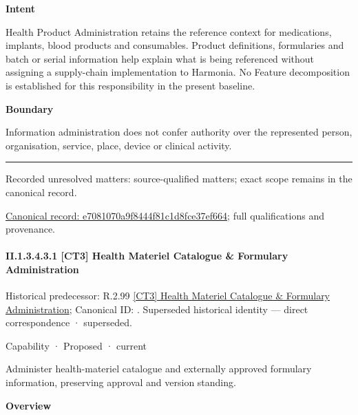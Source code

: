 \textbf{Intent}



Health Product Administration retains the reference context for medications, implants, blood products and consumables. Product definitions, formularies and batch or serial information help explain what is being referenced without assigning a supply-chain implementation to Harmonia. No Feature decomposition is established for this responsibility in the present baseline.



\textbf{Boundary}



Information administration does not confer authority over the represented person, organisation, service, place, device or clinical activity.



\medskip\hrule\medskip

{\small Recorded unresolved matters: source-qualified matters; exact scope remains in the canonical record.}\par
{\footnotesize \href{../../../../continuum/strategy/capability/e7081070a9f8444f81c1d8fce37ef664.md}{Canonical record: e7081070a9f8444f81c1d8fce37ef664}; full qualifications and provenance.}\par
\paragraph*{II.1.3.4.3.1 [CT3] Health Materiel Catalogue \& Formulary Administration}
\label{navigation:II.1.3.4.3.1}

{\small Historical predecessor: R.2.99 \hyperref[element:5c691959e2cc4a289fc25b9f3497eed9]{[CT3] Health Materiel Catalogue \& Formulary Administration}; Canonical ID: \texttt{}. Superseded historical identity — direct correspondence · superseded.}\par
\label{element:28b327760af94b8b986357469524d793}
{\small Capability · Proposed · current}\par

Administer health-materiel catalogue and externally approved formulary information, preserving approval and version standing.



\textbf{Overview}



